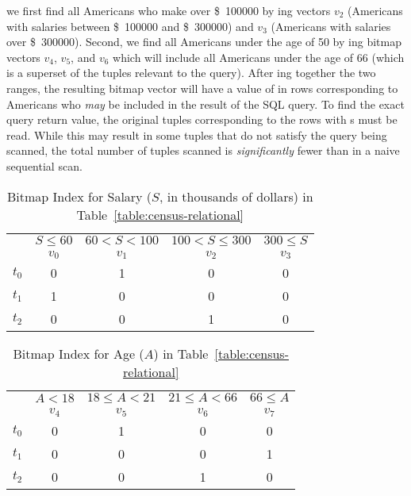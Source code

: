 we first find all Americans who make over \SI{100000}[\$]{} by ing
vectors \(v_2\) (Americans with salaries between \SI{100000}[\$]{} and
\SI{300000}[\$]{}) and \(v_3\) (Americans with salaries over \SI{300000}[\$]{}).
Second, we find all Americans under the age of 50 by ing bitmap vectors
\(v_4\), \(v_5\), and \(v_6\) which will include all Americans under the age of 66 (which is a superset of the tuples relevant to the query). After ing together the two ranges, the resulting bitmap vector will have a value of  in rows corresponding
to Americans who \emph{may} be included in the result of the SQL query. To find the exact query return value,
the original tuples corresponding to the rows with s must be read.
While this may result in some tuples that do not satisfy the query being scanned,
the total number of tuples scanned is \emph{significantly} fewer than in a naive sequential scan.
\begin{table}[H]
    \centering
    \caption{Bitmap Index for Salary (\(S\), in thousands of dollars) in Table~\ref{table:census-relational}}
    \label{table:census-salary}
    \begin{tabular}{@{}r||c|c|c|c@{}}
        \toprule
                & \(S \leq 60\) & \(60 < S < 100\) & \(100 < S \leq 300\) & \(300 \leq S\) \\
                & \(v_0\) & \(v_1\) & \(v_2\) & \(v_3\) \\
        \midrule
        \(t_0\) & 0          & 1             & 0          & 0             \\
        \(t_1\) & 1          & 0             & 0          & 0             \\
        \(t_2\) & 0          & 0             & 1          & 0             \\
        \bottomrule
    \end{tabular}
\end{table}
%
\begin{table}[H]
    \centering
    \caption{Bitmap Index for Age (\(A\)) in Table~\ref{table:census-relational}}
    \label{table:census-age}
    \begin{tabular}{@{}r||c|c|c|c@{}}
        \toprule
                & \(A < 18\) & \(18 \leq  A < 21\) & \(21 \leq A < 66\) & \(66 \leq A\) \\
                & \(v_4\) & \(v_5\) & \(v_6\) & \(v_7\) \\
        \midrule
        \(t_0\) & 0          & 1             & 0          & 0             \\
        \(t_1\) & 0          & 0             & 0          & 1             \\
        \(t_2\) & 0          & 0             & 1          & 0             \\
        \bottomrule
    \end{tabular}
\end{table}
